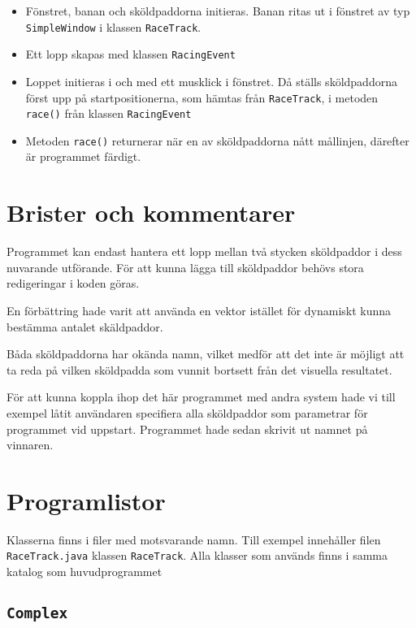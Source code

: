 \documentclass[a4paper]{article}
\newcommand{\code}[1]{\texttt{#1}} %
\begin{document}
\begin{itemize}
\item Fönstret, banan och sköldpaddorna initieras. Banan ritas ut i fönstret av typ \code{SimpleWindow} i klassen \code{RaceTrack}.
\item Ett lopp skapas med klassen \code{RacingEvent}
\item Loppet initieras i och med ett musklick i fönstret. Då ställs sköldpaddorna först upp på startpositionerna, som hämtas från \code{RaceTrack},  i metoden \code{race()} från klassen \code{RacingEvent}
\item Metoden \code{race()} returnerar när en av sköldpaddorna nått mållinjen, därefter är programmet färdigt. 
\end{itemize}

\section{Brister och kommentarer}
Programmet kan endast hantera ett lopp mellan två stycken sköldpaddor i dess nuvarande utförande. För att kunna lägga till sköldpaddor behövs stora redigeringar i koden göras.

En förbättring hade varit att använda en vektor istället för dynamiskt kunna bestämma antalet skäldpaddor.

Båda sköldpaddorna har okända namn, vilket medför att det inte är möjligt att ta reda på vilken sköldpadda som vunnit bortsett från det visuella resultatet. 

För att kunna koppla ihop det här programmet med andra system hade vi till exempel låtit användaren specifiera alla sköldpaddor som parametrar för programmet vid uppstart. Programmet hade sedan skrivit ut namnet på vinnaren.


\section{Programlistor}
Klasserna finns i filer med motsvarande namn. Till exempel innehåller filen  \code{RaceTrack.java} klassen \code{RaceTrack}. Alla klasser som används finns i samma katalog som huvudprogrammet

\subsection{\code{Complex}}
\end{document}
